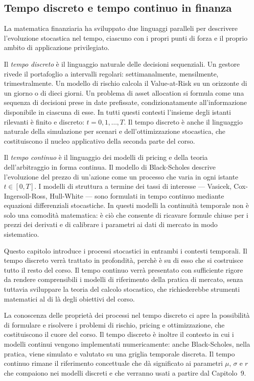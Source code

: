 \subsection{Tempo discreto e tempo continuo in finanza}

La matematica finanziaria ha sviluppato due linguaggi paralleli per
descrivere l'evoluzione stocastica nel tempo, ciascuno con i propri
punti di forza e il proprio ambito di applicazione privilegiato.

Il \emph{tempo discreto} \`{e} il linguaggio naturale delle decisioni
sequenziali. Un gestore rivede il portafoglio a intervalli regolari:
settimanalmente, mensilmente, trimestralmente. Un modello di rischio
calcola il Value-at-Risk su un orizzonte di un giorno o di dieci giorni.
Un problema di asset allocation si formula come una sequenza di decisioni
prese in date prefissate, condizionatamente all'informazione disponibile
in ciascuna di esse. In tutti questi contesti l'insieme degli istanti
rilevanti \`{e} finito e discreto: $t = 0, 1, \ldots, T$. Il tempo
discreto \`{e} anche il linguaggio naturale della simulazione per scenari
e dell'ottimizzazione stocastica, che costituiscono il nucleo applicativo
della seconda parte del corso.

Il \emph{tempo continuo} \`{e} il linguaggio dei modelli di pricing e
della teoria dell'arbitraggio in forma continua. Il modello di
Black-Scholes descrive l'evoluzione del prezzo di un'azione come un
processo che varia in ogni istante $t \in [0,T]$. I modelli di struttura
a termine dei tassi di interesse --- Vasicek, Cox-Ingersoll-Ross,
Hull-White --- sono formulati in tempo continuo mediante equazioni
differenziali stocastiche. In questi modelli la continuit\`{a} temporale
non \`{e} solo una comodit\`{a} matematica: \`{e} ci\`{o} che consente
di ricavare formule chiuse per i prezzi dei derivati e di calibrare i
parametri ai dati di mercato in modo sistematico.

Questo capitolo introduce i processi stocastici in entrambi i contesti
temporali. Il tempo discreto verr\`{a} trattato in profondit\`{a}, perch\`{e}
\`{e} su di esso che si costruisce tutto il resto del corso. Il tempo
continuo verr\`{a} presentato con sufficiente rigore da rendere
comprensibili i modelli di riferimento della pratica di mercato, senza
tuttavia sviluppare la teoria del calcolo stocastico, che richiederebbe
strumenti matematici al di l\`{a} degli obiettivi del corso.

La conoscenza delle propriet\`{a} dei processi  nel tempo discreto ci apre la possibilit\`{a} di formulare e risolvere i problemi di rischio, pricing e ottimizzazione, che costituiscono il cuore del corso.
Il tempo discreto \`{e} inoltre il contesto in cui i modelli continui vengono
implementati numericamente: anche Black-Scholes, nella pratica, viene
simulato e valutato su una griglia temporale discreta. Il tempo continuo
rimane il riferimento concettuale che d\`{a} significato ai parametri
$\mu$, $\sigma$ e $r$ che compaiono nei modelli discreti e che verranno
usati a partire dal Capitolo~9.

